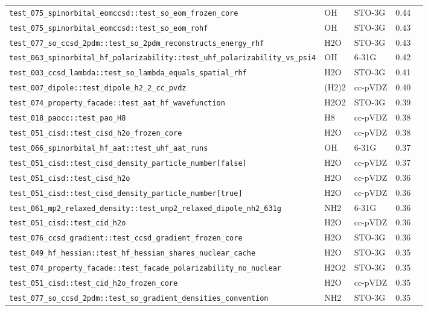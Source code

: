 \documentclass[10pt]{article}
\begin{document}
\begin{longtable}{l l l r c}
\texttt{test\_075\_spinorbital\_eomccsd::test\_so\_eom\_frozen\_core} & OH & STO-3G & 0.44 &  \\
\texttt{test\_075\_spinorbital\_eomccsd::test\_so\_eom\_rohf} & OH & STO-3G & 0.43 &  \\
\texttt{test\_077\_so\_ccsd\_2pdm::test\_so\_2pdm\_reconstructs\_energy\_rhf} & H2O & STO-3G & 0.43 &  \\
\texttt{test\_063\_spinorbital\_hf\_polarizability::test\_uhf\_polarizability\_vs\_psi4} & OH & 6-31G & 0.42 &  \\
\texttt{test\_003\_ccsd\_lambda::test\_so\_lambda\_equals\_spatial\_rhf} & H2O & STO-3G & 0.41 &  \\
\texttt{test\_007\_dipole::test\_dipole\_h2\_2\_cc\_pvdz} & (H2)2 & cc-pVDZ & 0.40 &  \\
\texttt{test\_074\_property\_facade::test\_aat\_hf\_wavefunction} & H2O2 & STO-3G & 0.39 &  \\
\texttt{test\_018\_paocc::test\_pao\_H8} & H8 & cc-pVDZ & 0.38 &  \\
\texttt{test\_051\_cisd::test\_cisd\_h2o\_frozen\_core} & H2O & cc-pVDZ & 0.38 &  \\
\texttt{test\_066\_spinorbital\_hf\_aat::test\_uhf\_aat\_runs} & OH & 6-31G & 0.37 &  \\
\texttt{test\_051\_cisd::test\_cisd\_density\_particle\_number[false]} & H2O & cc-pVDZ & 0.37 &  \\
\texttt{test\_051\_cisd::test\_cisd\_h2o} & H2O & cc-pVDZ & 0.36 &  \\
\texttt{test\_051\_cisd::test\_cisd\_density\_particle\_number[true]} & H2O & cc-pVDZ & 0.36 &  \\
\texttt{test\_061\_mp2\_relaxed\_density::test\_ump2\_relaxed\_dipole\_nh2\_631g} & NH2 & 6-31G & 0.36 &  \\
\texttt{test\_051\_cisd::test\_cid\_h2o} & H2O & cc-pVDZ & 0.36 &  \\
\texttt{test\_076\_ccsd\_gradient::test\_ccsd\_gradient\_frozen\_core} & H2O & STO-3G & 0.36 &  \\
\texttt{test\_049\_hf\_hessian::test\_hf\_hessian\_shares\_nuclear\_cache} & H2O & STO-3G & 0.35 &  \\
\texttt{test\_074\_property\_facade::test\_facade\_polarizability\_no\_nuclear} & H2O2 & STO-3G & 0.35 &  \\
\texttt{test\_051\_cisd::test\_cid\_h2o\_frozen\_core} & H2O & cc-pVDZ & 0.35 &  \\
\texttt{test\_077\_so\_ccsd\_2pdm::test\_so\_gradient\_densities\_convention} & NH2 & STO-3G & 0.35 &  \\

\end{longtable}
\end{document}
